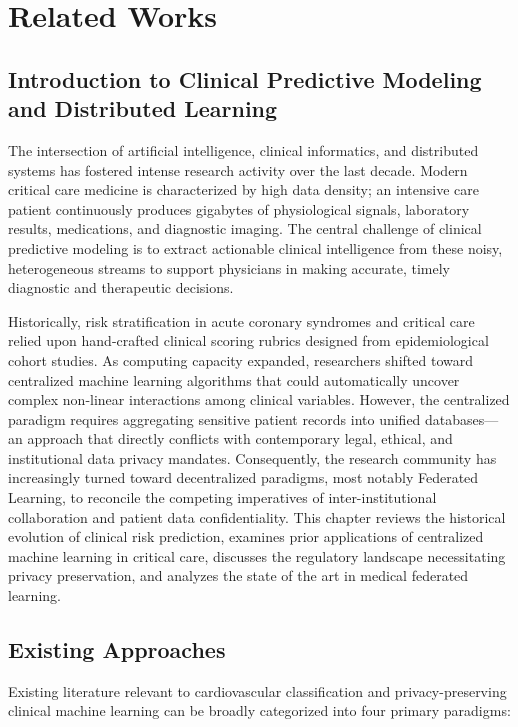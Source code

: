 \documentclass[12pt,a4paper,oneside]{report}
\begin{document}
\chapter{Related Works}
\label{ch:related_works}

\section{Introduction to Clinical Predictive Modeling and Distributed Learning}
\label{sec:rel_intro}

The intersection of artificial intelligence, clinical informatics, and distributed systems has fostered intense research activity over the last decade. Modern critical care medicine is characterized by high data density; an intensive care patient continuously produces gigabytes of physiological signals, laboratory results, medications, and diagnostic imaging. The central challenge of clinical predictive modeling is to extract actionable clinical intelligence from these noisy, heterogeneous streams to support physicians in making accurate, timely diagnostic and therapeutic decisions.

Historically, risk stratification in acute coronary syndromes and critical care relied upon hand-crafted clinical scoring rubrics designed from epidemiological cohort studies. As computing capacity expanded, researchers shifted toward centralized machine learning algorithms that could automatically uncover complex non-linear interactions among clinical variables. However, the centralized paradigm requires aggregating sensitive patient records into unified databases—an approach that directly conflicts with contemporary legal, ethical, and institutional data privacy mandates. Consequently, the research community has increasingly turned toward decentralized paradigms, most notably Federated Learning, to reconcile the competing imperatives of inter-institutional collaboration and patient data confidentiality. This chapter reviews the historical evolution of clinical risk prediction, examines prior applications of centralized machine learning in critical care, discusses the regulatory landscape necessitating privacy preservation, and analyzes the state of the art in medical federated learning.

\section{Existing Approaches}
\label{sec:existing_approaches}

Existing literature relevant to cardiovascular classification and privacy-preserving clinical machine learning can be broadly categorized into four primary paradigms:
\end{document}
